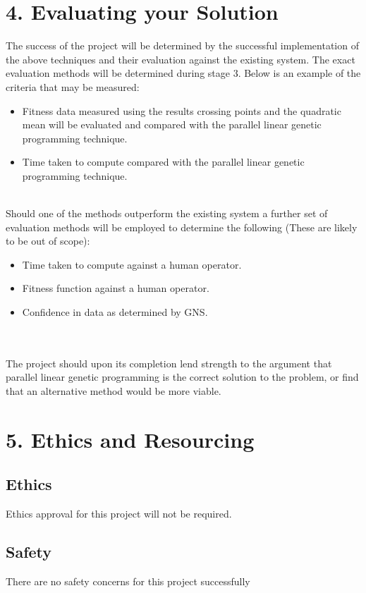 \documentclass[11pt, a4paper, twoside, openright]{report}
\begin{document}
\section*{4. Evaluating your Solution}

The success of the project will be determined by the successful implementation
of the above techniques and their evaluation against the existing system. The exact
evaluation methods will be determined during stage 3. Below is an example of the criteria that may be measured:

\begin{itemize}
 \item Fitness data measured using the results crossing points and the quadratic mean will be evaluated and compared with the parallel linear genetic programming technique.
 \item Time taken to compute compared with the parallel linear genetic programming technique.
\end{itemize}


\\
Should one of the methods
outperform the existing system a further set of evaluation methods will be
employed to determine the following (These are likely to be out of scope):
\begin{itemize}
 \item Time taken to compute against a human operator.
 \item Fitness function against a human operator.
 \item Confidence in data as determined by GNS.
\end{itemize}

\\
\\
The project should upon its completion lend strength to the argument that parallel linear genetic programming is the correct solution to the problem, or find that an alternative method would be more viable.

\section*{5. Ethics and Resourcing}


\subsection*{Ethics}
Ethics approval for this project will not be required. 

\subsection*{Safety}
There are no safety concerns for this project
successfully
\end{document}
